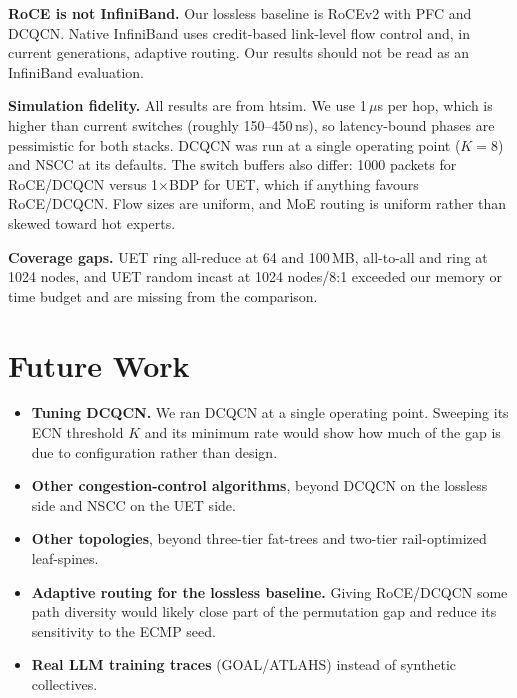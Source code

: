 \documentclass[conference]{IEEEtran}
\begin{document}
\textbf{RoCE is not InfiniBand.}
Our lossless baseline is RoCEv2 with PFC and DCQCN. Native InfiniBand uses
credit-based link-level flow control and, in current generations, adaptive
routing. Our results should not be read as an InfiniBand evaluation.

\textbf{Simulation fidelity.}
All results are from htsim. We use 1\,$\mu$s per hop, which is higher than
current switches (roughly 150--450\,ns), so latency-bound phases are pessimistic
for both stacks. DCQCN was run at a single operating point ($K{=}8$) and NSCC at
its defaults. The switch buffers also differ: 1000 packets for RoCE/DCQCN versus
1$\times$BDP for UET, which if anything favours RoCE/DCQCN. Flow sizes are
uniform, and MoE routing is uniform rather than skewed toward hot experts.

\textbf{Coverage gaps.}
UET ring all-reduce at 64 and 100\,MB, all-to-all and ring at 1024 nodes, and
UET random incast at 1024 nodes/8:1 exceeded our memory or time budget and are
missing from the comparison.

\section{Future Work}
\label{sec:future}

\begin{itemize}
  \item \textbf{Tuning DCQCN.} We ran DCQCN at a single operating point. Sweeping
        its ECN threshold $K$ and its minimum rate would show how much of the
        gap is due to configuration rather than design.
  \item \textbf{Other congestion-control algorithms}, beyond DCQCN on the
        lossless side and NSCC on the UET side.
  \item \textbf{Other topologies}, beyond three-tier fat-trees and two-tier
        rail-optimized leaf-spines.
  \item \textbf{Adaptive routing for the lossless baseline.} Giving RoCE/DCQCN
        some path diversity would likely close part of the permutation gap and
        reduce its sensitivity to the ECMP seed.
  \item \textbf{Real LLM training traces} (GOAL/ATLAHS) instead of synthetic
        collectives.
\end{itemize}

\end{document}
